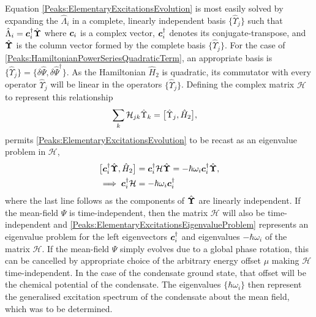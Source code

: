 Equation \eqref{Peaks:ElementaryExcitationsEvolution} is most easily solved by expanding the $\hat{\Lambda}_i$ in a complete, linearly independent basis $\{\hat{\Upsilon}_j\}$ such that $\hat{\Lambda}_i = \bm{c}_i^\dagger \hat{\bm{\Upsilon}}$ where $\bm{c}_i$ is a complex vector, $\bm{c}_i^\dagger$ denotes its conjugate-transpose, and $\hat{\bm{\Upsilon}}$ is the column vector formed by the complete basis $\{\hat{\Upsilon}_j\}$. For the case of \eqref{Peaks:HamiltonianPowerSeriesQuadraticTerm}, an appropriate basis is $\{\hat{\Upsilon}_j\} = \{\delta\hat{\Psi}, \delta\hat{\Psi}^\dagger\}$. As the Hamiltonian $\hat{H}_2$ is quadratic, its commutator with every operator $\hat{\Upsilon}_j$ will be linear in the operators $\{\hat{\Upsilon}_j\}$. Defining the complex matrix $\mathcal{H}$ to represent this relationship
\begin{align}
    \label{Peaks:ScriptHRelationshipToHamiltonian}
    \sum_k \mathcal{H}_{jk} \hat{\Upsilon}_k &= \comm{\hat{\Upsilon}_j, \hat{H}_2},
\end{align}
permits \eqref{Peaks:ElementaryExcitationsEvolution} to be recast as an eigenvalue problem in $\mathcal{H}$,
\begin{align}
    \comm{\vect{c}_i^\dagger \hat{\vect{\Upsilon}}, \hat{H}_2} &= \vect{c}_i^\dagger \mathcal{H} \hat{\vect{\Upsilon}} = - \hbar \omega_i \vect{c}_i^\dagger \hat{\vect{\Upsilon}}, \label{Peaks:ElementaryExcitationsEigenvalueProblemWithOperators}\\
    \implies \vect{c}_i^\dagger \mathcal{H} &= - \hbar \omega_i \vect{c}_i^\dagger \label{Peaks:ElementaryExcitationsEigenvalueProblem}
\end{align}
where the last line follows as the components of $\hat{\bm{\Upsilon}}$ are linearly independent. If the mean-field $\Psi$ is time-independent, then the matrix $\mathcal{H}$ will also be time-independent and \eqref{Peaks:ElementaryExcitationsEigenvalueProblem} represents an eigenvalue problem for the left eigenvectors $\bm{c}_i^\dagger$ and eigenvalues $-\hbar \omega_i$ of the matrix $\mathcal{H}$. If the mean-field $\Psi$ simply evolves due to a global phase rotation, this can be cancelled by appropriate choice of the arbitrary energy offset $\mu$ making $\mathcal{H}$ time-independent.  In the case of the condensate ground state, that offset will be the chemical potential of the condensate. The eigenvalues $\{\hbar \omega_i\}$ then represent the generalised excitation spectrum of the condensate about the mean field, which was to be determined. 

